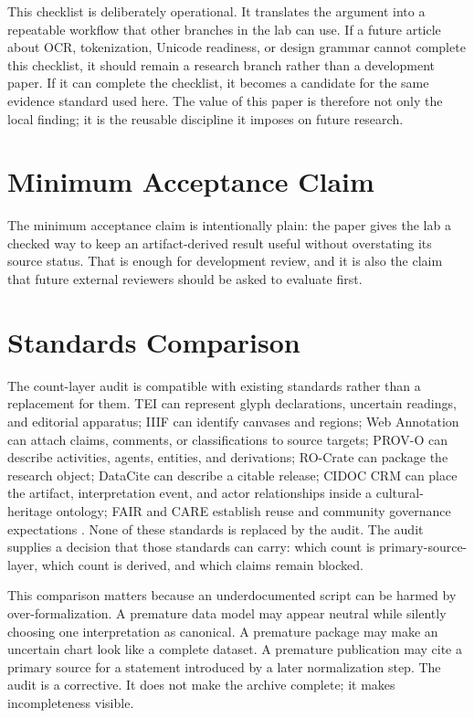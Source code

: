 \documentclass[sigconf,nonacm]{acmart}
\begin{document}
This checklist is deliberately operational. It translates the argument into a
repeatable workflow that other branches in the lab can use. If a future article
about OCR, tokenization, Unicode readiness, or design grammar cannot complete
this checklist, it should remain a research branch rather than a development
paper. If it can complete the checklist, it becomes a candidate for the same
evidence standard used here. The value of this paper is therefore not
only the local finding; it is the reusable discipline it imposes on future
research.

\section{Minimum Acceptance Claim}
The minimum acceptance claim is intentionally plain: the paper gives the lab a
checked way to keep an artifact-derived result useful without overstating its
source status. That is enough for development review, and it is also the claim
that future external reviewers should be asked to evaluate first.



\section{Standards Comparison}
The count-layer audit is compatible with existing standards rather than a
replacement for them. TEI can represent glyph declarations, uncertain readings,
and editorial apparatus; IIIF can identify canvases and regions; Web Annotation
can attach claims, comments, or classifications to source targets; PROV-O can
describe activities, agents, entities, and derivations; RO-Crate can package the
research object; DataCite can describe a citable release; CIDOC CRM can place
the artifact, interpretation event, and actor relationships inside a
cultural-heritage ontology; FAIR and CARE establish reuse and community
governance expectations \cite{azuonye1992,omniglotNwagu,unicodeAfricanScripts2023,scriptSourceNwagu,sirisNwaguProposal,teiP5Glyphs,iiifPresentation3,w3cAnnotationModel,w3cAnnotationVocab,w3cProvO,rocrate12,cidocCrm,datacite45,wilkinson2016fair,carroll2020care,wadden2020scifact,gao2023alce,karpathyAutoresearch,acmSubmissions,arxivSubmitTex}. None of these standards is
replaced by the audit. The audit supplies a decision that those standards can
carry: which count is primary-source-layer, which count is derived, and which
claims remain blocked.

This comparison matters because an underdocumented script can be harmed by
over-formalization. A premature data model may appear neutral while silently
choosing one interpretation as canonical. A premature package may make an
uncertain chart look like a complete dataset. A premature publication may cite a
primary source for a statement introduced by a later normalization step. The
audit is a corrective. It does not make the archive complete; it makes
incompleteness visible.
\end{document}
